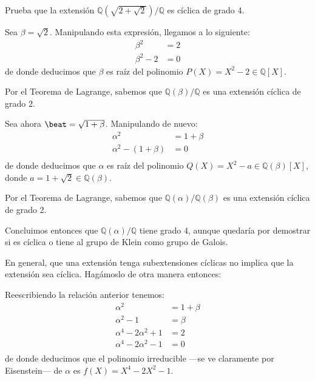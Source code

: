 \documentclass[a4paper, 11pt]{article}
\begin{document}
  \maketitle

  \begin{ejercicio}
      Prueba que la extensión $\mathbb{Q}(\sqrt{2+\sqrt{2}})/\mathbb{Q}$ es cíclica de grado 4.
  \end{ejercicio}

  \begin{solucion}
      Sea $\beta = \sqrt{2}$. Manipulando esta expresión, llegamos a lo siguiente:
      \begin{align*}
          \beta^2 &= 2 \\
          \beta^2 - 2 &= 0
      \end{align*}
      de donde deducimos que $\beta$ es raíz del polinomio $P(X) = X^2 - 2 \in \mathbb{Q}[X]$.

      Por el Teorema de Lagrange, sabemos que $\mathbb{Q}(\beta)/\mathbb{Q}$ es una extensión cíclica de grado 2.

      Sea ahora $\beat = \sqrt{1+\beta}$. Manipulando de nuevo:
      \begin{align*}
          \alpha^2 &= 1 + \beta \\
          \alpha^2 - (1 + \beta) &= 0 \\
      \end{align*}
      de donde deducimos que $\alpha$ es raíz del polinomio $Q(X) = X^2 - a \in \mathbb{Q}(\beta)[X]$, donde $a = 1 + \sqrt{2} \in \mathbb{Q}(\beta)$.

      Por el Teorema de Lagrange, sabemos que $\mathbb{Q}(\alpha)/\mathbb{Q}(\beta)$ es una extensión cíclica de grado 2.

      Concluimos entonces que $\mathbb{Q}(\alpha)/\mathbb{Q}$ tiene grado 4, aunque quedaría por demostrar si es cíclica o tiene al grupo de Klein como grupo de Galois.

      En general, que una extensión tenga subextensiones cíclicas no implica que la extensión sea cíclica. Hagámoslo de otra manera entonces:

      Reescribiendo la relación anterior tenemos:
      \begin{align*}
          \alpha^2 &= 1 + \beta \\
          \alpha^2 - 1 &= \beta \\
          \alpha^4 -2\alpha^2 + 1 &= 2 \\
          \alpha^4 -2\alpha^2 - 1 &= 0 \\
      \end{align*}
      de donde deducimos que el polinomio irreducible ---se ve claramente por Eisenstein--- de $\alpha$ es $f(X) = X^4 - 2X^2 -1$.


\end{solucion}
\end{document}
